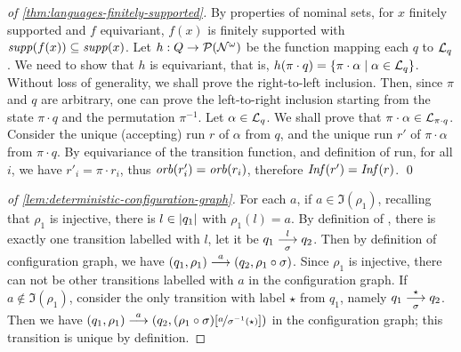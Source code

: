 
\begin{proof}[of \cref{thm:languages-finitely-supported}]
By properties of nominal sets, for $x$ finitely supported and $f$ equivariant, $f(x)$ is finitely supported with $\mathit{supp}(f(x))\subseteq \mathit{supp}(x)$. Let $h : Q \to \mathcal{P}(\mathcal{N}^\omega)$ be the function mapping each $q$ to $\mathcal{L}_q$. We need to show that $h$ is equivariant, that is, $h(\pi \cdot q) = \{ \pi \cdot \alpha \mid \alpha \in \mathcal{L}_q\}$. Without loss of generality, we shall prove the right-to-left inclusion. Then, since $\pi$ and $q$ are arbitrary, one can prove the left-to-right inclusion starting from the state $\pi \cdot q$ and the permutation $\pi^{-1}$. Let $\alpha \in \mathcal{L}_q$. We shall prove that $\pi\cdot\alpha \in \mathcal{L}_{\pi\cdot q}$. Consider the unique (accepting) run $r$ of $\alpha$ from $q$, and  the unique run $r'$ of $\pi \cdot \alpha$ from $\pi \cdot q$. By equivariance of the transition function, and definition of run, for all $i$, we have $r'_i = \pi \cdot r_i$, thus $\mathit{orb}(r'_i)=\mathit{orb}(r_i)$, therefore $\mathit{Inf}(r')= \mathit{Inf}(r)$. 
\qed 
\end{proof}
%
\begin{proof}[of \cref{lem:deterministic-configuration-graph}]
 For each $a$, if $a \in \Im(\rho_1)$, recalling that $\rho_1$ is injective, there is $l \in |q_1|$ with $\rho_1(l) = a$. By definition of \hdma, there is exactly one transition labelled with $l$, let it be $q_1 \overset{l}{\underset{\sigma}{\longrightarrow}} q_2$. Then by definition of configuration graph, we have $(q_1,\rho_1) \overset{a}{\longrightarrow} (q_2,\rho_1 \circ \sigma)$. Since $\rho_1$ is injective, there can not be other transitions labelled with $a$ in the configuration graph. If $a \notin \Im(\rho_1)$, consider the only transition with label $\star$ from $q_1$, namely $q_1 \overset{\star}{\underset{\sigma}{\longrightarrow}} q_2$.  Then we have $(q_1,\rho_1) \overset{a}{\longrightarrow} (q_2,(\rho_1 \circ \sigma)[\nicefrac{a}{\sigma^{-1}(\star)}])$ in the configuration graph; this transition is unique by definition.
\end{proof}

